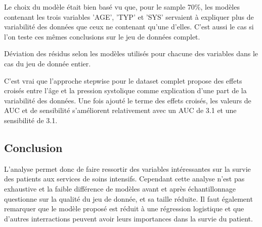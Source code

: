 \documentclass[10pt,a4paper,notitlepage,colorinlistoftodos]{article}
\begin{document}
Le choix du modèle était bien basé vu que, pour le sample 70\%, les modèles contenant les trois variables 'AGE', 'TYP' et 'SYS' servaient à expliquer plus de variabilité des données que ceux ne contenant qu'une d'elles. C'est aussi le cas si l'on teste ces mêmes conclusions sur le jeu de données complet. \

\begin{table}[h]
  \begin{center}
  
  \end{center}
  \caption{Déviation des résidus selon les modèles utilisés pour chacune des variables dans le cas du jeu de donnée entier.}
  \label{table:result2}
\end{table} 

C'est vrai que l'approche stepwise pour le dataset complet propose des effets croisés entre l'âge et la pression systolique comme explication d'une part de la variabilité des données. Une fois ajouté le terme des effets croisés, les valeurs de AUC et de sensibilité s'améliorent relativement avec un AUC de 3.1 et une sensibilité de 3.1.


\subsection*{Conclusion}

L'analyse permet donc de faire ressortir des variables intéressantes sur la survie des patients aux services de soins intensifs. Cependant cette analyse n'est pas exhaustive et la faible différence de modèles avant et après échantillonnage questionne sur la qualité du jeu de donnée, et sa taille réduite. Il faut également remarquer que le modèle proposé est réduit à une régression logistique et que d'autres interractions peuvent avoir leurs importances dans la survie du patient.


\fi

% 
% 
% 
% 
\end{document}
